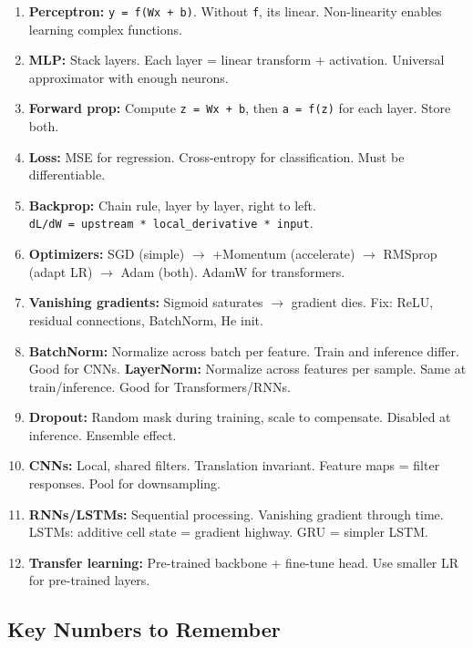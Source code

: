 \documentclass[11pt]{article}
\begin{document}
\begin{enumerate}
\def\labelenumi{\arabic{enumi}.}
\item
  \textbf{Perceptron:} \texttt{y\ =\ f(Wx\ +\ b)}. Without \texttt{f}, it\textquotesingle s linear. Non-linearity enables learning complex functions.
\item
  \textbf{MLP:} Stack layers. Each layer = linear transform + activation. Universal approximator with enough neurons.
\item
  \textbf{Forward prop:} Compute \texttt{z\ =\ Wx\ +\ b}, then \texttt{a\ =\ f(z)} for each layer. Store both.
\item
  \textbf{Loss:} MSE for regression. Cross-entropy for classification. Must be differentiable.
\item
  \textbf{Backprop:} Chain rule, layer by layer, right to left. \texttt{dL/dW\ =\ upstream\ *\ local\_derivative\ *\ input}.
\item
  \textbf{Optimizers:} SGD (simple) \(\rightarrow\) +Momentum (accelerate) \(\rightarrow\) RMSprop (adapt LR) \(\rightarrow\) Adam (both). AdamW for transformers.
\item
  \textbf{Vanishing gradients:} Sigmoid saturates \(\rightarrow\) gradient dies. Fix: ReLU, residual connections, BatchNorm, He init.
\item
  \textbf{BatchNorm:} Normalize across batch per feature. Train and inference differ. Good for CNNs.
  \textbf{LayerNorm:} Normalize across features per sample. Same at train/inference. Good for Transformers/RNNs.
\item
  \textbf{Dropout:} Random mask during training, scale to compensate. Disabled at inference. Ensemble effect.
\item
  \textbf{CNNs:} Local, shared filters. Translation invariant. Feature maps = filter responses. Pool for downsampling.
\item
  \textbf{RNNs/LSTMs:} Sequential processing. Vanishing gradient through time. LSTMs: additive cell state = gradient highway. GRU = simpler LSTM.
\item
  \textbf{Transfer learning:} Pre-trained backbone + fine-tune head. Use smaller LR for pre-trained layers.
\end{enumerate}

\subsection{Key Numbers to Remember}\label{key-numbers-to-remember}
\end{document}
